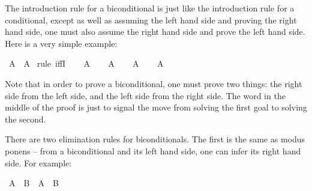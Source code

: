 \begin{isabellebody}
%
\isamarkuptrue%
%
\begin{isamarkuptext}%
The introduction rule for a biconditional is just like the introduction rule for a
conditional, except as well as assuming the left hand side and proving the right hand side, one
must also assume the right hand side and prove the left hand side. Here is a very simple example:%
\end{isamarkuptext}\isamarkuptrue%
\isamarkupfalse%
\ {\isachardoublequoteopen}A\ {\isasymlongleftrightarrow}\ A{\isachardoublequoteclose}\isanewline
%
\isadelimproof
%
\endisadelimproof
%
\isatagproof
{}\isamarkupfalse%
\ {\isacharparenleft}rule\ iffI{\isacharparenright}\isanewline
\ \ \isamarkupfalse%
\ {\isachardoublequoteopen}A{\isachardoublequoteclose}\isanewline
\ \ \isamarkupfalse%
\ {\isachardoublequoteopen}A{\isachardoublequoteclose}\isacommand{{\isachardot}}\isamarkupfalse%
\isanewline
{}\isamarkupfalse%
\isanewline
\ \ \isamarkupfalse%
\ {\isachardoublequoteopen}A{\isachardoublequoteclose}\isanewline
\ \ \isamarkupfalse%
\ {\isachardoublequoteopen}A{\isachardoublequoteclose}\isacommand{{\isachardot}}\isamarkupfalse%
\isanewline
{}\isamarkupfalse%
%
\endisatagproof
{\isafoldproof}%
%
\isadelimproof
%
\endisadelimproof
%
\begin{isamarkuptext}%
Note that in order to prove a biconditional, one must prove two things: the right side from 
the left side, and the left side from the right side. The word  in the middle of the
proof is just to signal the move from solving the first goal to solving the second.%
\end{isamarkuptext}\isamarkuptrue%
%
\isamarkuptrue%
%
\begin{isamarkuptext}%
There are two elimination rules for biconditionals. The first is the same as modus ponens --
from a biconditional and its left hand side, one can infer its right hand side. For example:%
\end{isamarkuptext}\isamarkuptrue%
\isamarkupfalse%
\ {\isachardoublequoteopen}{\isacharparenleft}A\ {\isasymlongleftrightarrow}\ B{\isacharparenright}\ {\isasymlongrightarrow}\ A\ {\isasymlongrightarrow}\ B{\isachardoublequoteclose}\isanewline
%
\isadelimproof
%
\endisadelimproof
%
\isatagproof
{}\isamarkupfalse%
\isanewline
\ \ \isamarkupfalse%

\end{isabellebody}
